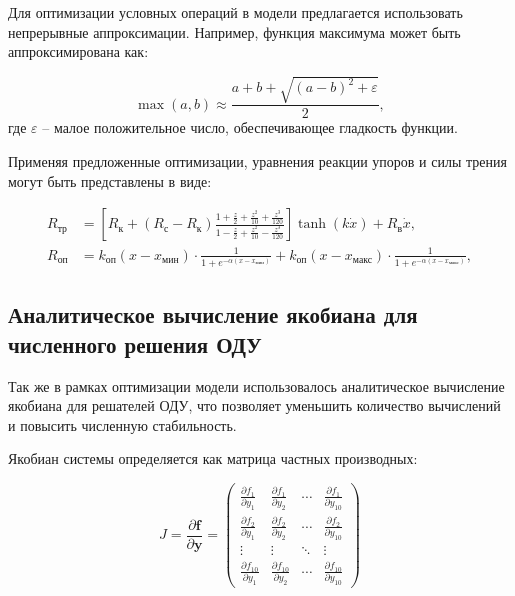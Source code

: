Для оптимизации условных операций в модели предлагается
использовать непрерывные аппроксимации. Например, функция
максимума может быть аппроксимирована как:

\begin{equation*}
    \max(a, b) \approx \frac{a + b + \sqrt{(a - b)^2 + \varepsilon}}{2},
\end{equation*}
где $\varepsilon$ -- малое положительное число, обеспечивающее гладкость функции.

Применяя предложенные оптимизации, уравнения реакции упоров и силы трения могут быть представлены в виде:

\begin{equation}
    \begin{alignedat}{2}
        R_\text{тр} & = \left[R_\text{к} + (R_\text{с} - R_\text{к})\frac{1 + \frac{z}{2} + \frac{z^2}{10} + \frac{z^3}{120}}{1 - \frac{z}{2} + \frac{z^2}{10} - \frac{z^3}{120}}\right]\tanh(k\dot{x}) + R_\text{в}\dot{x}, \\
        R_\text{оп} & = k_\text{оп}(x - x_\text{мин})\cdot \frac{1}{1 + e^{-\alpha(x - x_\text{мин})}} + k_\text{оп}(x - x_\text{макс})\cdot \frac{1}{1 + e^{-\alpha(x - x_\text{макс})}},
    \end{alignedat}
\end{equation}

\subsection{Аналитическое вычисление якобиана для численного решения ОДУ}\label{sec:ch2/sec5/subsec3}
Так же в рамках оптимизации модели использовалось аналитическое вычисление якобиана для
решателей ОДУ, что позволяет уменьшить количество вычислений и повысить численную стабильность.

Якобиан системы определяется как матрица частных производных:

\begin{equation}\label{eq:ch2/jacobian}
    J = \frac{\partial \mathbf{f}}{\partial \mathbf{y}} =
    \begin{pmatrix}
        \frac{\partial f_1}{\partial y_1}    & \frac{\partial f_1}{\partial y_2}    & \cdots & \frac{\partial f_1}{\partial y_{10}}    \\
        \frac{\partial f_2}{\partial y_1}    & \frac{\partial f_2}{\partial y_2}    & \cdots & \frac{\partial f_2}{\partial y_{10}}    \\
        \vdots                               & \vdots                               & \ddots & \vdots                                  \\
        \frac{\partial f_{10}}{\partial y_1} & \frac{\partial f_{10}}{\partial y_2} & \cdots & \frac{\partial f_{10}}{\partial y_{10}}
    \end{pmatrix}
\end{equation}

